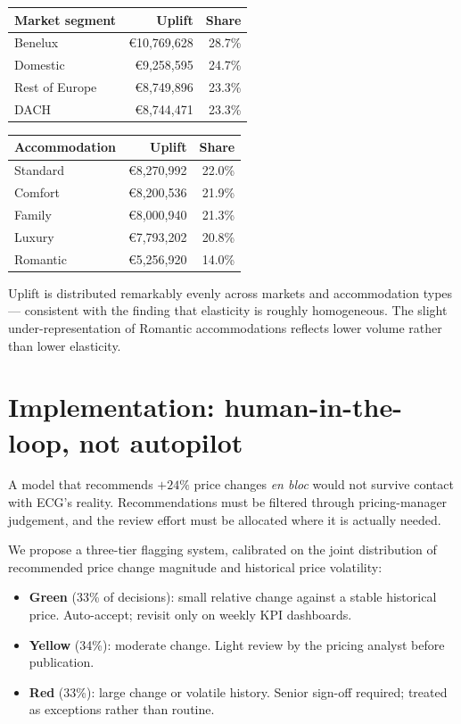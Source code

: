\documentclass[11pt,a4paper]{article}
\begin{document}
\begin{center}
\small
\begin{tabular}{@{}lrr@{}}
\toprule
\textbf{Market segment} & \textbf{Uplift} & \textbf{Share} \\
\midrule
Benelux & \euro{}10{,}769{,}628 & 28.7\% \\
Domestic & \euro{}9{,}258{,}595 & 24.7\% \\
Rest of Europe & \euro{}8{,}749{,}896 & 23.3\% \\
DACH & \euro{}8{,}744{,}471 & 23.3\% \\
\bottomrule
\end{tabular}
\quad
\begin{tabular}{@{}lrr@{}}
\toprule
\textbf{Accommodation} & \textbf{Uplift} & \textbf{Share} \\
\midrule
Standard & \euro{}8{,}270{,}992 & 22.0\% \\
Comfort & \euro{}8{,}200{,}536 & 21.9\% \\
Family & \euro{}8{,}000{,}940 & 21.3\% \\
Luxury & \euro{}7{,}793{,}202 & 20.8\% \\
Romantic & \euro{}5{,}256{,}920 & 14.0\% \\
\bottomrule
\end{tabular}
\end{center}

Uplift is distributed remarkably evenly across markets and accommodation types --- consistent with the finding that elasticity is roughly homogeneous. The slight under-representation of Romantic accommodations reflects lower volume rather than lower elasticity.

\section{Implementation: human-in-the-loop, not autopilot}

A model that recommends $+24\%$ price changes \emph{en bloc} would not survive contact with ECG's reality. Recommendations must be filtered through pricing-manager judgement, and the review effort must be allocated where it is actually needed.

We propose a three-tier flagging system, calibrated on the joint distribution of recommended price change magnitude and historical price volatility:

\begin{itemize}
  \item \textbf{Green} (33\% of decisions): small relative change against a stable historical price. Auto-accept; revisit only on weekly KPI dashboards.
  \item \textbf{Yellow} (34\%): moderate change. Light review by the pricing analyst before publication.
  \item \textbf{Red} (33\%): large change or volatile history. Senior sign-off required; treated as exceptions rather than routine.
\end{itemize}
\end{document}
